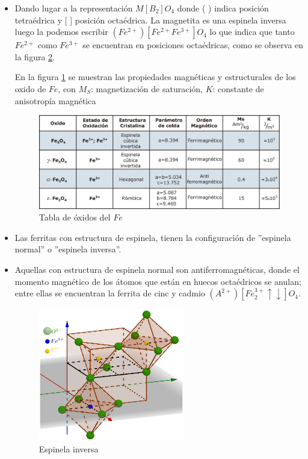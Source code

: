 \begin{itemize}
	\item Dando lugar a la representación $M[B_{2}]O_{4}$ donde ( ) indica posición tetraédrica y [ ] posición octaédrica. La magnetita es una espinela inversa luego la podemos escribir ${(Fe^{2+})[Fe^{2+}Fe^{3+}]O_{4}}$ lo que indica que tanto $Fe^{2+}$ como $Fe^{3+}$ se encuentran en posiciones octaédricas, como se observa en la figura \ref{fig:FeComplejo}.

En la figura \ref{fig:tablaDeOxidos} se muestran las propiedades magnéticas y estructurales de los oxido de $Fe$, con $M_{S}$: magnetización de saturación, $K$: constante de anisotropía magnética	
	
\begin{figure}[H]
    \centering
    \includegraphics[width=1.0\textwidth]{./Figures/tablaDeOxidos}
	\caption{Tabla de óxidos del $Fe$}
	\label{fig:tablaDeOxidos}
\end{figure}	
	
	
	\item Las ferritas con estructura de espinela, tienen la configuración de ''espinela normal” o ''espinela inversa”.

	\item Aquellas con estructura de espinela normal son antiferromagnéticas, donde el momento magnético de los átomos que están en huecos octaédricos se anulan; entre ellas se encuentran la ferrita de cinc y cadmio ${(A^{2+})[Fe_{2}^{3+}\uparrow\downarrow]O_{4}}$.
	
\begin{figure}[H]
    \centering
    \includegraphics[width=0.6\textwidth]{./Figures/FeComplejo}
	\caption{Espinela inversa}
	\label{fig:FeComplejo}
\end{figure}


\end{itemize}
